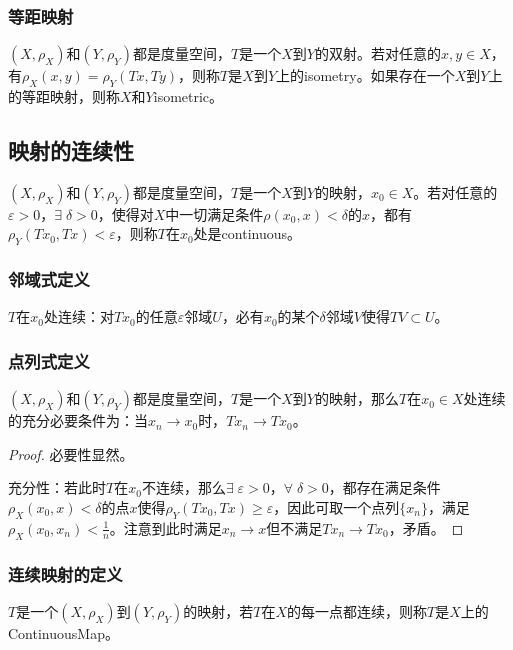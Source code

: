 \subsubsection{等距映射}
\begin{definition}
	$(X,\rho_X)$和$(Y,\rho_Y)$都是度量空间，$T$是一个$X$到$Y$的双射。若对任意的$x,y\in X$，有$\rho_X(x,y)=\rho_Y(Tx,Ty)$，则称$T$是$X$到$Y$上的\gls{isometry}。如果存在一个$X$到$Y$上的等距映射，则称$X$和$Y$\gls{isometric}。
\end{definition}
\subsection{映射的连续性}
\begin{definition}
	$(X,\rho_X)$和$(Y,\rho_Y)$都是度量空间，$T$是一个$X$到$Y$的映射，$x_0\in X$。若对任意的$\varepsilon>0$，$\exists\;\delta>0$，使得对$X$中一切满足条件$\rho(x_0,x)<\delta$的$x$，都有$\rho_Y(Tx_0,Tx)<\varepsilon$，则称$T$在$x_0$处是\gls{continuous}。
\end{definition}
\subsubsection{邻域式定义}
\begin{definition}
	$T$在$x_0$处连续：对$Tx_0$的任意$\varepsilon$邻域$U$，必有$x_0$的某个$\delta$邻域$V$使得$TV\subset U$。
\end{definition}
\subsubsection{点列式定义}
\begin{theorem}
	$(X,\rho_X)$和$(Y,\rho_Y)$都是度量空间，$T$是一个$X$到$Y$的映射，那么$T$在$x_0\in X$处连续的充分必要条件为：当$x_n\to x_0$时，$Tx_n\to Tx_0$。
\end{theorem}
\begin{proof}
	必要性显然。\par
	充分性：若此时$T$在$x_0$不连续，那么$\exists\;\varepsilon>0$，$\forall\;\delta>0$，都存在满足条件$\rho_X(x_0,x)<\delta$的点$x$使得$\rho_Y(Tx_0,Tx)\geqslant\varepsilon$，因此可取一个点列$\{x_n\}$，满足$\rho_X(x_0,x_n)<\frac{1}{n}$。注意到此时满足$x_n\to x$但不满足$Tx_n\to Tx_0$，矛盾。
\end{proof}
\subsubsection{连续映射的定义}
\begin{definition}
	$T$是一个$(X,\rho_X)$到$(Y,\rho_Y)$的映射，若$T$在$X$的每一点都连续，则称$T$是$X$上的\gls{ContinuousMap}。
\end{definition}
